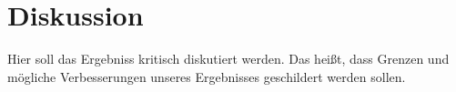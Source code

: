 \chapter{Diskussion} \label{diskussion}

\nocite{*}


Hier soll das Ergebniss kritisch diskutiert werden. Das heißt, dass Grenzen und mögliche Verbesserungen unseres Ergebnisses geschildert werden sollen.